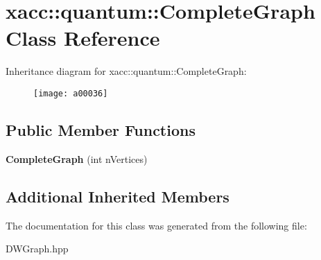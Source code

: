 \hypertarget{a00036}{}\section{xacc\+:\+:quantum\+:\+:Complete\+Graph Class Reference}
\label{a00036}
Inheritance diagram for xacc\+:\+:quantum\+:\+:Complete\+Graph\+:\begin{figure}[H]
\begin{center}
\leavevmode
\texttt{[image: a00036]}
\end{center}
\end{figure}
\subsection*{Public Member Functions}
\begin{DoxyCompactItemize}
\item 
{\bfseries Complete\+Graph} (int n\+Vertices)\hypertarget{a00036_a70eeb65709e217e61bb0066365579c39}{}\label{a00036_a70eeb65709e217e61bb0066365579c39}

\end{DoxyCompactItemize}
\subsection*{Additional Inherited Members}


The documentation for this class was generated from the following file\+:\begin{DoxyCompactItemize}
\item 
D\+W\+Graph.\+hpp\end{DoxyCompactItemize}
